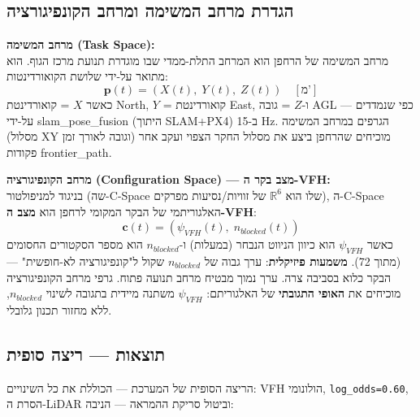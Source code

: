 \documentclass[11pt,a4paper]{article}
\begin{document}
\subsection{הגדרת מרחב המשימה ומרחב הקונפיגורציה}

\textbf{מרחב המשימה (\textenglish{Task Space}):} \\
מרחב המשימה של הרחפן הוא המרחב התלת-ממדי שבו מוגדרת תנועת מרכז הגוף. הוא מתואר על-ידי שלושת הקואורדינטות:
\begin{equation}
    \mathbf{p}(t) = (X(t),\; Y(t),\; Z(t)) \quad [\text{מ'}]
\end{equation}
כאשר $X$ = קואורדינטת \textenglish{North}, $Y$ = קואורדינטת \textenglish{East}, ו-$Z$ = גובה \textenglish{AGL} — כפי שנמדדים על-ידי \textenglish{slam\_pose\_fusion} (היתוך \textenglish{SLAM}+\textenglish{PX4}) ב-15 \textenglish{Hz}. הגרפים במרחב המשימה (מסלול \textenglish{XY} וגובה לאורך זמן) מוכיחים שהרחפן ביצע את מסלול החקר הצפוי ועקב אחר פקודות \textenglish{frontier\_path}.

\textbf{מרחב הקונפיגורציה (\textenglish{Configuration Space}) — מצב בקר ה-\textenglish{VFH}:} \\
בניגוד למניפולטור (שה-\textenglish{C-Space} שלו הוא $\mathbb{R}^6$ של זוויות/נסיעות מפרקים), ה-\textenglish{C-Space} האלגוריתמי של הבקר המקומי לרחפן הוא \textbf{מצב ה-\textenglish{VFH}}:
\begin{equation}
    \mathbf{c}(t) = \left(\psi_{VFH}(t),\; n_{blocked}(t)\right)
\end{equation}
כאשר $\psi_{VFH}$ הוא כיוון הניווט הנבחר (במעלות) ו-$n_{blocked}$ הוא מספר הסקטורים החסומים (מתוך 72). \textbf{משמעות פיזיקלית}: ערך גבוה של $n_{blocked}$ שקול ל"קונפיגורציה לא-חופשית" — הבקר כלוא בסביבה צרה. ערך נמוך מבטיח מרחב תנועה פתוח. גרפי מרחב הקונפיגורציה מוכיחים את \textbf{האופי התגובתי} של האלגוריתם: $\psi_{VFH}$ משתנה מיידית בתגובה לשינוי $n_{blocked}$, ללא מחזור תכנון גלובלי.

\subsection{תוצאות — ריצה סופית}

הריצה הסופית של המערכת — הכוללת את כל השינויים: \textenglish{VFH} הולונומי, \texttt{log\_odds=0.60}, הסרת ה-\textenglish{LiDAR} וביטול סריקת ההמראה — הניבה:
\end{document}
